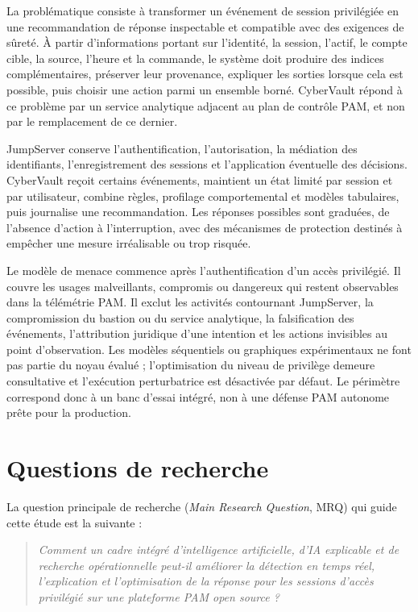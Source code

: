 \documentclass[11pt,a4paper,oneside]{report}
\theoremstyle{definition}
\theoremstyle{plain}
\begin{document}
La problématique consiste à transformer un événement de session privilégiée
en une recommandation de réponse inspectable et compatible avec des exigences
de sûreté. À partir d'informations portant sur l'identité, la session,
l'actif, le compte cible, la source, l'heure et la commande, le système doit
produire des indices complémentaires, préserver leur provenance, expliquer
les sorties lorsque cela est possible, puis choisir une action parmi un
ensemble borné. CyberVault répond à ce problème par un service analytique
adjacent au plan de contrôle PAM, et non par le remplacement de ce dernier.

JumpServer conserve l'authentification, l'autorisation, la médiation des
identifiants, l'enregistrement des sessions et l'application éventuelle des
décisions. CyberVault reçoit certains événements, maintient un état limité par
session et par utilisateur, combine règles, profilage comportemental et
modèles tabulaires, puis journalise une recommandation. Les réponses possibles
sont graduées, de l'absence d'action à l'interruption, avec des mécanismes de
protection destinés à empêcher une mesure irréalisable ou trop risquée.

Le modèle de menace commence après l'authentification d'un accès privilégié.
Il couvre les usages malveillants, compromis ou dangereux qui restent
observables dans la télémétrie PAM. Il exclut les activités contournant
JumpServer, la compromission du bastion ou du service analytique, la
falsification des événements, l'attribution juridique d'une intention et les
actions invisibles au point d'observation. Les modèles séquentiels ou
graphiques expérimentaux ne font pas partie du noyau évalué ; l'optimisation
du niveau de privilège demeure consultative et l'exécution perturbatrice est
désactivée par défaut. Le périmètre correspond donc à un banc d'essai
intégré, non à une défense PAM autonome prête pour la production.

\section{Questions de recherche}
\label{sec:intro-rqs}

La question principale de recherche (\emph{Main Research Question}, MRQ) qui
guide cette étude est la suivante :
\begin{quote}
\emph{Comment un cadre intégré d'intelligence artificielle, d'IA explicable
et de recherche opérationnelle peut-il améliorer la détection en temps réel,
l'explication et l'optimisation de la réponse pour les sessions d'accès
privilégié sur une plateforme PAM open source ?}
\end{quote}
\end{document}
